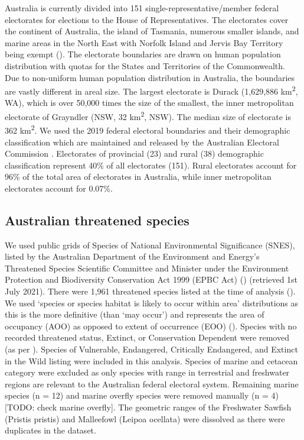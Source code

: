 \documentclass[a4paper,11pt]{article}
\begin{document}
Australia is currently divided into 151 single-representative/member federal electorates for elections to the House of Representatives. The electorates cover the continent of Australia, the island of Tasmania, numerous smaller islands, and marine areas in the North East with Norfolk Island and Jervis Bay Territory being exempt (\cite{parliamentofaustraliaElectoralDivisions2018}). The electorate boundaries are drawn on human population distribution with quotas for the States and Territories of the Commonwealth. Due to non-uniform human population distribution in Australia, the boundaries are vastly different in areal size. The largest electorate is Durack (1,629,886 km\textsuperscript{2}, WA), which is over 50,000 times the size of the smallest, the inner metropolitan electorate of Grayndler (NSW, 32 km\textsuperscript{2}, NSW). The median size of electorate is 362 km\textsuperscript{2}. We used the 2019 federal electoral boundaries and their demographic classification which are maintained and released by the Australian Electoral Commission \cite{australiaelectoralcomissionFederalElectoralBoundaries2019}. Electorates of provincial (23) and rural (38) demographic classification represent 40\% of all electorates (151). Rural electorates account for 96\% of the total area of electorates in Australia, while inner metropolitan electorates account for 0.07\%.

\subsection{Australian threatened species}

We used public grids of Species of National Environmental Significance (SNES), listed by the Australian Department of the Environment and Energy’s Threatened Species Scientific Committee and Minister under the Environment Protection and Biodiversity Conservation Act 1999 (EPBC Act) (\cite{commonwealthofaustraliaThreatenedSpeciesEPBC2021}) (retrieved 1st July 2021). There were 1,961 threatened species listed at the time of analysis (\cite{commonwealthofaustraliaThreatenedSpeciesEPBC2021}). We used ‘species or species habitat is likely to occur within area’ distributions as this is the more definitive (than ‘may occur’) and represents the area of occupancy (AOO) as opposed to extent of occurrence (EOO) (\cite{gastonSizesSpeciesGeographic2009, lloydEstimatingSpatialCoverage2020}). Species with no recorded threatened status, Extinct, or Conservation Dependent were removed (as per \cite{wardNationalscaleDatasetThreats}). Species of Vulnerable, Endangered, Critically Endangered, and Extinct in the Wild listing were included in this analysis. Species of marine and cetacean category were excluded as only species with range in terrestrial and freshwater regions are relevant to the Australian federal electoral system. Remaining marine species (n = 12) and marine overfly species were removed manually (n = 4) [TODO: check marine overfly]. The geometric ranges of the Freshwater Sawfish (Pristis pristis) and Malleefowl (Leipoa ocellata) were dissolved as there were duplicates in the dataset.
\end{document}
